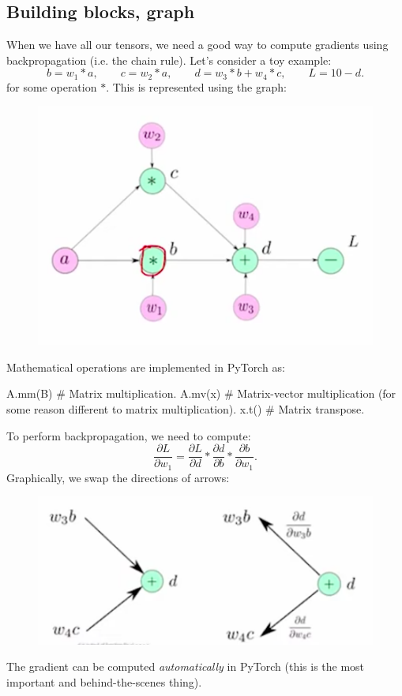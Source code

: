 \subsection{Building blocks, graph}
When we have all our tensors, we need a good way to compute gradients using backpropagation (i.e. the chain rule). Let's consider a toy example:
\begin{equation*}
b = w_1 * a, \qquad c = w_2 * a, \qquad d = w_3 * b + w_4 * c, \qquad L = 10 - d.
\end{equation*}
for some operation $*$. This is represented using the graph:
\begin{figure}[H]
\centering
\includegraphics[scale=0.4]{toymodel.png}
\end{figure}
Mathematical operations are implemented in PyTorch as:
\begin{python}
A.mm(B)		# Matrix multiplication.
A.mv(x)		# Matrix-vector multiplication (for some reason different to matrix multiplication).
x.t()		# Matrix transpose.
\end{python}
To perform backpropagation, we need to compute:
\begin{equation*}
\frac{\partial L}{\partial w_1} = \frac{\partial L}{\partial d} * \frac{\partial d}{\partial b} * \frac{\partial b}{\partial w_1}. 
\end{equation*}
Graphically, we swap the directions of arrows:
\begin{figure}[H]
\centering
\includegraphics[scale=0.4]{toybackpropagation.png}
\end{figure}
The gradient can be computed \textit{automatically} in PyTorch (this is the most important and behind-the-scenes thing).\\

